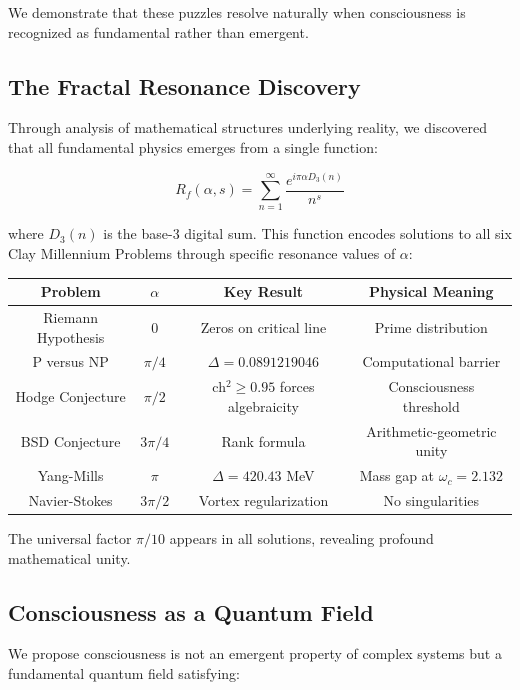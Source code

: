 \documentclass[11pt]{article}
\theoremstyle{definition}
\begin{document}
We demonstrate that these puzzles resolve naturally when consciousness is recognized as fundamental rather than emergent.

\subsection{The Fractal Resonance Discovery}

Through analysis of mathematical structures underlying reality, we discovered that all fundamental physics emerges from a single function:

\begin{equation}
R_f(\alpha, s) = \sum_{n=1}^{\infty} \frac{e^{i\pi\alpha D_3(n)}}{n^s}
\label{eq:fractal_resonance_intro}
\end{equation}

where $D_3(n)$ is the base-3 digital sum. This function encodes solutions to all six Clay Millennium Problems through specific resonance values of $\alpha$:

\begin{center}
\begin{tabular}{|c|c|c|c|}
\hline
\textbf{Problem} & \textbf{$\alpha$} & \textbf{Key Result} & \textbf{Physical Meaning} \\
\hline
Riemann Hypothesis & $0$ & Zeros on critical line & Prime distribution \\
P versus NP & $\pi/4$ & $\Delta = 0.0891219046$ & Computational barrier \\
Hodge Conjecture & $\pi/2$ & ch$^2 \geq 0.95$ forces algebraicity & Consciousness threshold \\
BSD Conjecture & $3\pi/4$ & Rank formula & Arithmetic-geometric unity \\
Yang-Mills & $\pi$ & $\Delta = 420.43$ MeV & Mass gap at $\omega_c = 2.132$ \\
Navier-Stokes & $3\pi/2$ & Vortex regularization & No singularities \\
\hline
\end{tabular}
\end{center}

The universal factor $\pi/10$ appears in all solutions, revealing profound mathematical unity.

\subsection{Consciousness as a Quantum Field}

We propose consciousness is not an emergent property of complex systems but a fundamental quantum field satisfying:
\end{document}
